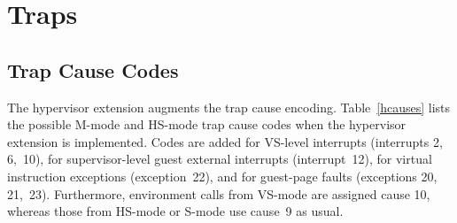 \section{Traps}

\subsection{Trap Cause Codes}

The hypervisor extension augments the trap cause encoding.
Table~\ref{hcauses} lists the possible M-mode and HS-mode trap cause
codes when the hypervisor extension is implemented.
Codes are added for VS-level interrupts (interrupts 2, 6,~10), for
supervisor-level guest external interrupts (interrupt~12), for virtual
instruction exceptions (exception~22), and for guest-page faults
(exceptions 20, 21,~23).
Furthermore, environment calls from VS-mode are assigned cause 10,
whereas those from HS-mode or S-mode use cause~9 as usual.

